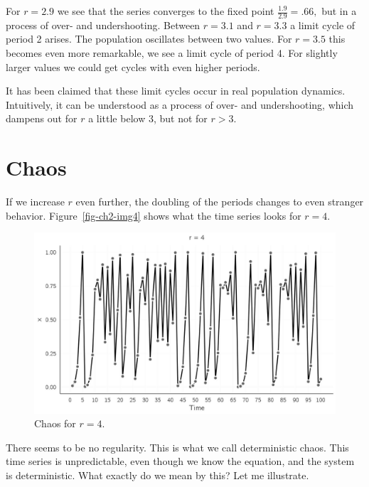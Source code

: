 \documentclass[
  a4paper,
  DIV=11,
  numbers=noendperiod,
  oneside]{scrreprt}
\begin{document}
For \(r = 2.9\) we see that the series converges to the fixed point
\(\frac{1.9}{2.9} = .66,\) but in a process of over- and undershooting.
Between \(r = 3.1\) and \(r = 3.3\) a limit cycle of period 2 arises.
The population oscillates between two values. For \(r = 3.5\) this
becomes even more remarkable, we see a limit cycle of period 4. For
slightly larger values we could get cycles with even higher periods.

It has been claimed that these limit cycles occur in real population
dynamics. Intuitively, it can be understood as a process of over- and
undershooting, which dampens out for \(r\) a little below 3, but not for
\(r > 3\).

\hypertarget{sec-Chaos}{%
\section{Chaos}\label{sec-Chaos}}

If we increase \(r\) even further, the doubling of the periods changes
to even stranger behavior. Figure~\ref{fig-ch2-img4} shows what the time
series looks for \(r = 4\).

\begin{figure}

{\centering \includegraphics{media/ch2/fig-ch2-img5.jpg}

}

\caption{\label{fig-ch2-img5}Chaos for \(r = 4\).}

\end{figure}

There seems to be no regularity. This is what we call deterministic
chaos. This time series is unpredictable, even though we know the
equation, and the system is deterministic. What exactly do we mean by
this? Let me illustrate.
\end{document}

